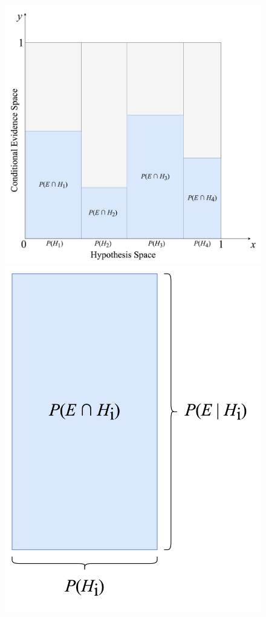\documentclass[12pt]{article}
\begin{document}
\begin{figure}[h!]
    \centering
    \begin{minipage}{0.72\textwidth}
        \centering
        \includegraphics[width=\textwidth]{assets/visual_5.png}
    \end{minipage}\hfill
    \begin{minipage}{0.28\textwidth}
        \centering
        \includegraphics[width=\textwidth]{assets/visual_6.png}

\end{minipage}
\end{figure}
\end{document}
